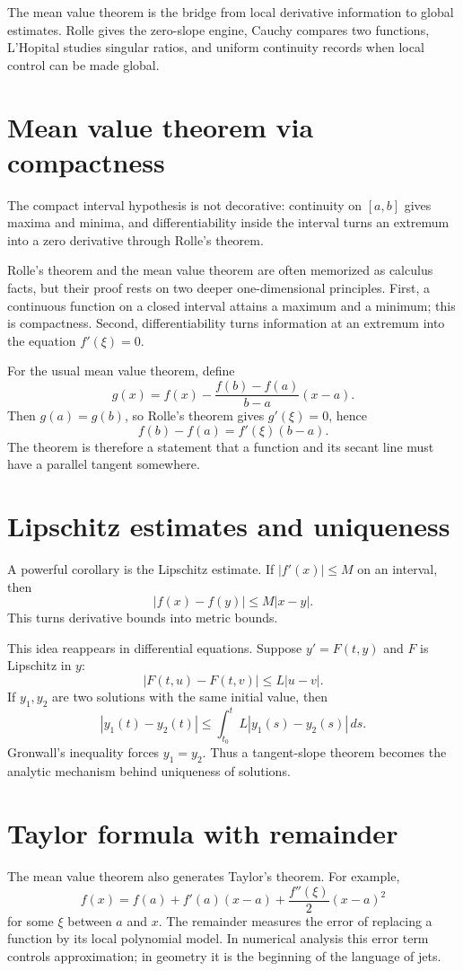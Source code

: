The mean value theorem is the bridge from local derivative information to global estimates.  Rolle gives the zero-slope engine, Cauchy compares two functions, L'Hopital studies singular ratios, and uniform continuity records when local control can be made global.

\section{Mean value theorem via compactness}

\begin{remark}
The compact interval hypothesis is not decorative: continuity on \([a,b]\) gives maxima and minima, and differentiability inside the interval turns an extremum into a zero derivative through Rolle's theorem.
\end{remark}


Rolle's theorem and the mean value theorem are often memorized as calculus facts, but their proof rests on two deeper one-dimensional principles.  First, a continuous function on a closed interval attains a maximum and a minimum; this is compactness.  Second, differentiability turns information at an extremum into the equation $f'(\xi)=0$.

For the usual mean value theorem, define
\[
  g(x)=f(x)-\frac{f(b)-f(a)}{b-a}(x-a).
\]
Then $g(a)=g(b)$, so Rolle's theorem gives $g'(\xi)=0$, hence
\[
  f(b)-f(a)=f'(\xi)(b-a).
\]
The theorem is therefore a statement that a function and its secant line must have a parallel tangent somewhere.

\section{Lipschitz estimates and uniqueness}

A powerful corollary is the Lipschitz estimate.  If $|f'(x)|\le M$ on an interval, then
\[
  |f(x)-f(y)|\le M|x-y|.
\]
This turns derivative bounds into metric bounds.

This idea reappears in differential equations.  Suppose $y'=F(t,y)$ and $F$ is Lipschitz in $y$:
\[
  |F(t,u)-F(t,v)|\le L|u-v|.
\]
If $y_1,y_2$ are two solutions with the same initial value, then
\[
  |y_1(t)-y_2(t)|\le \int_{t_0}^t L|y_1(s)-y_2(s)|\,ds.
\]
Gronwall's inequality forces $y_1=y_2$.  Thus a tangent-slope theorem becomes the analytic mechanism behind uniqueness of solutions.

\section{Taylor formula with remainder}

The mean value theorem also generates Taylor's theorem.  For example,
\[
  f(x)=f(a)+f'(a)(x-a)+\frac{f''(\xi)}2(x-a)^2
\]
for some $\xi$ between $a$ and $x$.  The remainder measures the error of replacing a function by its local polynomial model.  In numerical analysis this error term controls approximation; in geometry it is the beginning of the language of jets.
